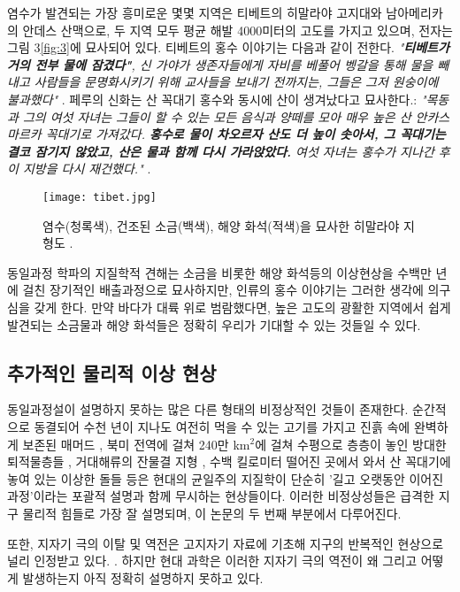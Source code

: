 \documentclass[10pt,twocolumn,letterpaper]{article}
\begin{document}
\begin{개요}
염수가 발견되는 가장 흥미로운 몇몇 지역은  티베트의 히말라야 고지대와 남아메리카의 안데스 산맥으로, 두 지역 모두 평균 해발 4000미터의 고도를 가지고 있으며, 전자는 그림 3\ref{fig:3}에 묘사되어 있다. 티베트의 홍수 이야기는 다음과 같이 전한다. \textit{"\textbf{티베트가 거의 전부 물에 잠겼다"}, 신 가야가 생존자들에게 자비를 베풀어 벵갈을 통해 물을 빼내고  사람들을 문명화시키기 위해 교사들을 보내기 전까지는, 그들은 그저 원숭이에 불과했다"} \cite{3}. 페루의 신화는 산 꼭대기 홍수와 동시에 산이 생겨났다고 묘사한다.: \textit{"목동과 그의 여섯 자녀는 그들이 할 수 있는 모든 음식과 양떼를 모아 매우 높은 산 안카스마르카 꼭대기로 가져갔다. \textbf{홍수로 물이 차오르자  산도 더 높이 솟아서, 그 꼭대기는 결코 잠기지 않았고, 산은 물과 함께 다시 가라앉았다.} 여섯 자녀는 홍수가 지나간 후  이 지방을 다시 재건했다."} \cite{3}.

\begin{figure}[t]
\begin{center}
   \texttt{[image: tibet.jpg]}
\end{center}
   \caption{염수(청록색), 건조된 소금(백색), 해양 화석(적색)을 묘사한 히말라야 지형도 \cite{15,16,86,87}.}
\label{fig:3}
\label{fig:onecol}
\end{figure}

동일과정 학파의 지질학적 견해는 소금을 비롯한 해양 화석등의 이상현상을 수백만 년에 걸친 장기적인 배출과정으로 묘사하지만, 인류의 홍수 이야기는 그러한 생각에 의구심을 갖게 한다. 만약 바다가 대륙 위로 범람했다면, 높은 고도의 광활한 지역에서 쉽게 발견되는 소금물과 해양 화석들은 정확히 우리가 기대할 수 있는 것들일 수 있다.

\subsection{추가적인 물리적 이상 현상 }

동일과정설이 설명하지 못하는 많은 다른 형태의 비정상적인 것들이 존재한다. 순간적으로 동결되어 수천 년이 지나도 여전히 먹을 수 있는 고기를 가지고 진흙 속에 완벽하게 보존된 매머드 \cite{17,18,19}, 북미 전역에 걸쳐 240만 km$^2$에 걸쳐 수평으로 층층이 놓인 방대한 퇴적물층들  \cite{21}, 거대해류의 잔물결 지형 \cite{22}, 수백 킬로미터 떨어진 곳에서 와서 산 꼭대기에 놓여 있는 이상한 돌들  \cite{23,26} 등은 현대의 균일주의 지질학이 단순히 '길고 오랫동안 이어진 과정'이라는 포괄적 설명과 함께  무시하는 현상들이다. 이러한 비정상성들은 급격한 지구 물리적 힘들로 가장 잘 설명되며, 이 논문의 두 번째 부분에서 다루어진다.

또한, 지자기 극의 이탈 및 역전은 고지자기 자료에 기초해 지구의 반복적인 현상으로 널리 인정받고 있다. \cite{35,40,41}. 하지만 현대 과학은 이러한 지자기 극의 역전이 왜 그리고 어떻게 발생하는지 아직 정확히 설명하지 못하고 있다.


\end{개요}
\end{document}
